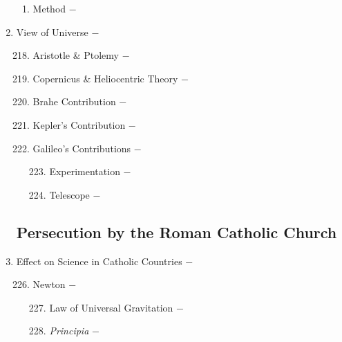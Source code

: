 \documentclass[12pt]{article}
\begin{document}
\begin{enumerate}
\begin{enumerate}[label=\arabic{*}.]
\item Method $-$

\end{enumerate}
\setcounter{enumi}{216}

\item View of Universe $-$ 

\begin{enumerate}[label=\arabic{*}.]
\setcounter{enumii}{217}

\item Aristotle \& Ptolemy $-$ 

\item Copernicus \& Heliocentric Theory $-$ 

\item Brahe Contribution $-$ 

\item Kepler's Contribution $-$ 

\item Galileo's Contributions $-$ 

\begin{enumerate}[label=\arabic{*}.]
\setcounter{enumiii}{222}

\item Experimentation $-$ 

\item Telescope $-$


\end{enumerate}



\end{enumerate}
\setcounter{enumi}{224}

\subsection{Persecution by the Roman Catholic Church}

\item Effect on Science in Catholic Countries $-$

 
\begin{enumerate}[label=\arabic{*}.]
\setcounter{enumii}{225}

\item Newton $-$ 

\begin{enumerate}[label=\arabic{*}.]
\setcounter{enumiii}{226}

\item Law of Universal Gravitation $-$ 

\item \textit{Principia} $-$


\end{enumerate}
\end{enumerate}
\end{enumerate}
\end{document}
